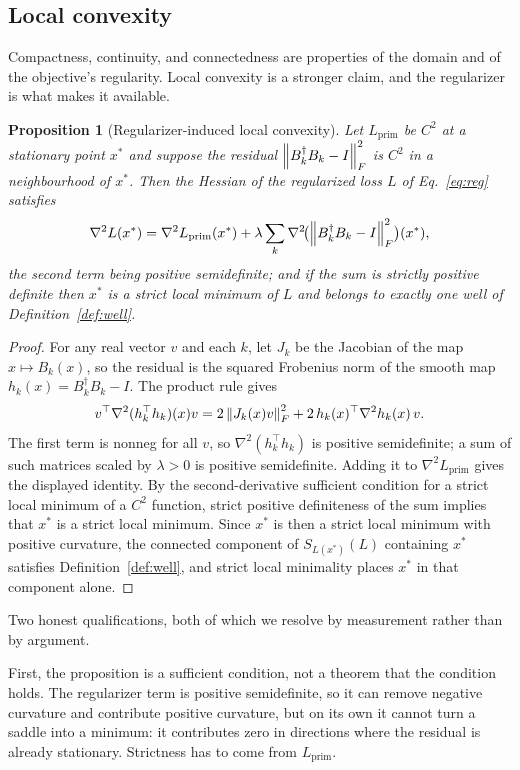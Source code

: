 \documentclass[twocolumn,aps,prl,superscriptaddress,showkeys]{revtex4-2}
\theoremstyle{plain}
\newtheorem{proposition}{Proposition}
\theoremstyle{definition}
\begin{document}
\subsection{Local convexity}
\label{sec:convexity}

Compactness, continuity, and connectedness are properties of the domain and of the objective's regularity. Local convexity is a stronger claim, and the regularizer is what makes it available.

\begin{proposition}[Regularizer-induced local convexity]
\label{prop:convexity}
Let $L_{\mathrm{prim}}$ be $C^2$ at a stationary point $x^*$ and suppose the residual $\norm{B_k^\dagger B_k-I}_F^2$ is $C^2$ in a neighbourhood of $x^*$. Then the Hessian of the regularized loss $L$ of Eq.~\eqref{eq:reg} satisfies
\[
\nabla^2 L(x^*)=\nabla^2 L_{\mathrm{prim}}(x^*)+\lambda\sum_k \nabla^2\!\bigl(\norm{B_k^\dagger B_k-I}_F^2\bigr)(x^*),
\]
the second term being positive semidefinite; and if the sum is strictly positive definite then $x^*$ is a strict local minimum of $L$ and belongs to exactly one well of Definition~\ref{def:well}.
\end{proposition}
\begin{proof}
For any real vector $v$ and each $k$, let $J_k$ be the Jacobian of the map $x\mapsto B_k(x)$, so the residual is the squared Frobenius norm of the smooth map $h_k(x)=B_k^\dagger B_k-I$. The product rule gives
\[
v^\top\nabla^2(h_k^\top h_k)(x)v
=2\,\norm{J_k(x)v}_F^2+2\,h_k(x)^\top \nabla^2 h_k(x)\,v.
\]
The first term is nonneg for all $v$, so $\nabla^2(h_k^\top h_k)$ is positive semidefinite; a sum of such matrices scaled by $\lambda>0$ is positive semidefinite. Adding it to $\nabla^2 L_{\mathrm{prim}}$ gives the displayed identity. By the second-derivative sufficient condition for a strict local minimum of a $C^2$ function, strict positive definiteness of the sum implies that $x^*$ is a strict local minimum. Since $x^*$ is then a strict local minimum with positive curvature, the connected component of $S_{L(x^*)}(L)$ containing $x^*$ satisfies Definition~\ref{def:well}, and strict local minimality places $x^*$ in that component alone.
\end{proof}

Two honest qualifications, both of which we resolve by measurement rather than by argument.

First, the proposition is a sufficient condition, not a theorem that the condition holds. The regularizer term is positive semidefinite, so it can remove negative curvature and contribute positive curvature, but on its own it cannot turn a saddle into a minimum: it contributes zero in directions where the residual is already stationary. Strictness has to come from $L_{\mathrm{prim}}$.
\end{document}
